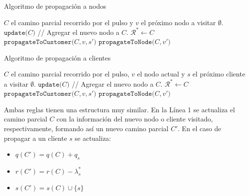 \begin{algorithm}[H]
  \caption{Algoritmo de propagación a nodos}
  \label{al:pulse-node-propagation}
  \begin{algorithmic}[1]
  	\Require $C$ el camino parcial recorrido por el pulso y $v$ el próximo nodo a visitar 
  	\Ensure $\emptyset$.
  	\State $\texttt{update(} C \texttt{)}$ // Agregar el nuevo nodo a $C$.
                \State $\mathscr{R}^{*} \gets C$
            \Else
                    \State $\texttt{propagateToCustomer(} C, v, s'\texttt{)}$
                \EndFor
                    \State $\texttt{propagateToNode(} C, v' \texttt{)}$
                \EndFor
            \EndIf
        \EndIf
  \end{algorithmic}
\end{algorithm}

\begin{algorithm}[H]
  \caption{Algoritmo de propagación a clientes}
  \label{al:pulse-customer-propagation}
  \begin{algorithmic}[1]
  	\Require $C$ el camino parcial recorrido por el pulso, $v$ el nodo actual y $s$ el próximo cliente a visitar
  	\Ensure $\emptyset$.
  	\State $\texttt{update(} C \texttt{)}$ // Agregar el nuevo nodo a $C$.
                \State $\mathscr{R}^{*} \gets C$
            \Else
                    \State $\texttt{propagateToCustomer(} C, v, s'\texttt{)}$
                \EndFor
                    \State $\texttt{propagateToNode(} C, v' \texttt{)}$
                \EndFor
            \EndIf
        \EndIf
  \end{algorithmic}
\end{algorithm}

Ambas reglas tienen una estructura muy similar. En la Línea 1 se actualiza el camino parcial $C$ con la información del nuevo nodo o cliente visitado, respectivamente, formando así un nuevo camino parcial $C'$. En el caso de propagar a un cliente $s$ se actualiza:
\begin{itemize}
    \item $q(C') = q(C) + q_s$
    \item $r(C') = r(C) - \lambda^{*}_s$
    \item $s(C') = s(C) \cup \{s\}$
\end{itemize}

